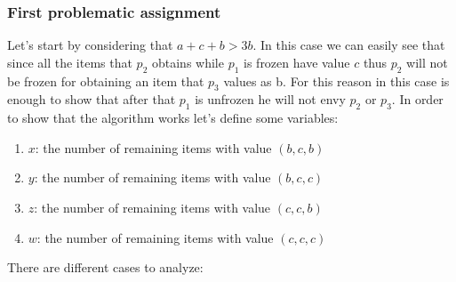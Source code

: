 \documentclass{article}
\begin{document}
\subsubsection{First problematic assignment}
Let's start by considering that $a + c + b > 3b$. In this case we can easily see that since all the items that $p_2$ obtains while $p_1$ is frozen have value $c$ thus $p_2$ will not be frozen for obtaining an item that $p_3$ values as b. For this reason in this case is enough to show that after that $p_1$ is unfrozen he will not envy $p_2$ or $p_3$. In order to show that the algorithm works let's define some variables:
\begin{enumerate}
    \item $x$: the number of remaining items with value $(b,c,b)$ \label{item:three-players-two-two-values-one-three-first-problematic-type-bcb}
    \item $y$: the number of remaining items with value $(b,c,c)$
    \label{item:three-players-two-two-values-one-three-first-problematic-type-bcc}
    \item $z$: the number of remaining items with value $(c,c,b)$
    \label{item:three-players-two-two-values-one-three-first-problematic-type-ccb}
    \item $w$: the number of remaining items with value $(c,c,c)$
    \label{item:three-players-two-two-values-one-three-first-problematic-type-ccc}
\end{enumerate}
There are different cases to analyze:
\end{document}
